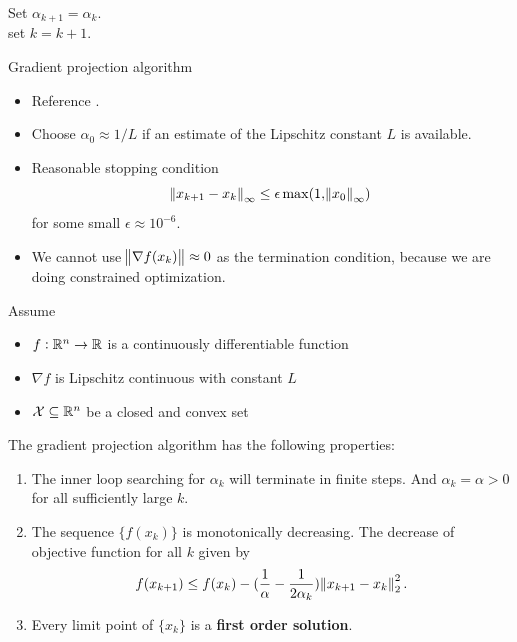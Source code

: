 \begin{refsection}
\begin{algorithm}[H]
{		
		Set $\alpha_{k+1} = \alpha_k$.\\
		set $k = k+1$.
	}
	\caption{Gradient projection algorithm}
\end{algorithm}

\begin{remark}\hfill
\begin{itemize}
	\item Reference \cite{Robinson2015convex}.
	\item Choose $\alpha_0 \approx 1/L$ if an estimate of the Lipschitz constant $L$ is available.
	\item Reasonable stopping condition 
	$$\norm{x_{k+1} - x_k}_\infty \leq \epsilon \max(1,\norm{x_0}_\infty)$$
	for some small $\epsilon \approx 10^{-6}$.
	\item We cannot use $\norm{\nabla f(x_k)} \approx 0$ as the termination condition, because we are doing constrained optimization.
\end{itemize}
	
\end{remark}


\begin{lemma}
Assume
\begin{itemize}
	\item $f:\mathbb{R}^n\to \mathbb{R}$ is a continuously differentiable function
	\item $\nabla f$ is Lipschitz continuous with constant $L$
	\item $\mathcal{X} \subseteq \mathbb{R}^n$ be a closed and convex set
\end{itemize}
The gradient projection algorithm has the following properties:
\begin{enumerate}
	\item The inner loop searching for $\alpha_k$ will terminate in finite steps. And $\alpha_k = \alpha > 0$ for all sufficiently large $k$.
	\item The sequence $\{f(x_k)\}$ is monotonically decreasing. The decrease of objective function for all $k$ given by
		$$f(x_{k+1}) \leq f(x_k) - (\frac{1}{\alpha} - \frac{1}{2\alpha_k})\norm{x_{k+1}-x_k}_2^2.$$
	\item Every limit point of $\{x_k\}$ is a \textbf{first order solution}.

\end{enumerate} 
\end{lemma}


\end{refsection}
